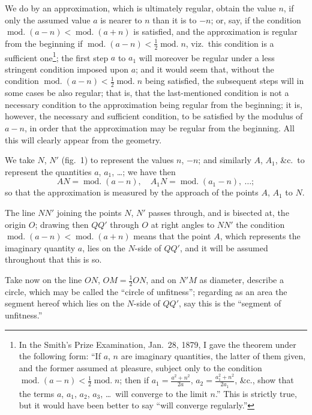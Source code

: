 \documentclass[12pt,a4paper]{article}
\theoremstyle{plain}
\begin{document}
We do by an approximation, which is ultimately regular, obtain the
value $n$, if only the assumed value $a$ is nearer to $n$ than it is to $-n$;
or, say, if the condition $\operatorname{mod.}(a-n)<\operatorname{mod.}(a+n)$ is satisfied, and
the approximation is regular from the beginning if
$\operatorname{mod.}(a-n)<\frac{1}{2}\operatorname{mod.}n$, viz.~this condition is a sufficient
one\footnote{In the Smith's Prize Examination, Jan.~28, 1879, I gave the theorem under
the following form: ``If $a$, $n$ are imaginary quantities, the latter of them given,
and the former assumed at pleasure, subject only to the condition
$\operatorname{mod.}(a-n)<\frac{1}{2}\operatorname{mod.}n$; then if
$a_1=\frac{a^2+n^2}{2a}$, $a_2=\frac{a_1^2+n^2}{2a_1}$, \&c., show that the terms
$a$, $a_1$, $a_2$, $a_3$, \dots\ will converge to the limit $n$.'' This is strictly true,
but it would have been better to say ``will converge regularly.''};
the first step $a$ to $a_1$ will moreover be regular under a less stringent
condition imposed upon $a$; and it would seem that, without the condition
$\operatorname{mod.}(a-n)<\frac{1}{2}\operatorname{mod.}n$ being satisfied, the subsequent
steps will in some cases be also regular; that is, that the last-mentioned
condition is not a necessary condition to the approximation being regular
from the beginning; it is, however, the necessary and sufficient condition,
to be satisfied by the modulus of $a-n$, in order that the approximation
may be regular from the beginning. All this will clearly appear from the
geometry.

We take $N$, $N'$ (fig.~1) to represent the values $n$, $-n$; and similarly
$A$, $A_1$, \&c.\ to represent the quantities $a$, $a_1$, \dots; we have then
\[
AN = \operatorname{mod.}(a-n),\quad A_1N = \operatorname{mod.}(a_1-n),\ \ldots;
\]
so that the approximation is measured by the approach of the points $A$,
$A_1$ to $N$.

The line $NN'$ joining the points $N$, $N'$ passes through, and is
bisected at, the origin $O$; drawing then $QQ'$ through $O$ at right angles
to $NN'$ the condition $\operatorname{mod.}(a-n)<\operatorname{mod.}(a+n)$ means that
the point $A$, which represents the imaginary quantity $a$, lies on the
$N$-side of $QQ'$, and it will be assumed throughout that this is so.

Take now on the line $ON$, $OM=\frac{1}{2}ON$, and on $N'M$ as diameter,
describe a circle, which may be called the ``circle of unfitness''; regarding
as an area the segment hereof which lies on the $N$-side of $QQ'$, say this
is the ``segment of unfitness.''
\end{document}
